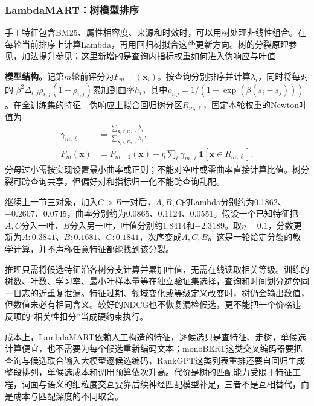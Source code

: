 \Needspace{100mm}
\subsubsection{LambdaMART：树模型排序}
\label{sec:rs-search-lambdamart}

手工特征包含BM25、属性相容度、来源和时效时，可以用树处理非线性组合。在每轮当前排序上计算Lambda，再用回归树拟合这些更新方向。树的分裂原理参见，加法提升参见；这里新增的是查询内指标权重如何进入伪响应与叶值

\textbf{模型结构。}记第$m$轮前评分为$F_{m-1}(\bm x_i)$。按查询分别排序并计算$\lambda_i$，同时将每对的
$\beta^2\Delta_{i,j}\rho_{i,j}(1-\rho_{i,j})$累加到曲率$h_i$，其中$\rho_{i,j}=1/(1+\exp(\beta(s_i-s_j)))$。在全训练集的特征—伪响应上拟合回归树分区$R_{m,\ell}$，固定本轮权重的Newton叶值为
\begin{equation}
 \begin{split}
 \gamma_{m,\ell}&=
 \frac{\sum_{\bm x_i\in R_{m,\ell}}\lambda_i}
      {\sum_{\bm x_i\in R_{m,\ell}}h_i},\\
 F_m(\bm x)&=F_{m-1}(\bm x)+
 \eta\sum_\ell\gamma_{m,\ell}\mathbf1[\bm x\in R_{m,\ell}].
 \end{split}
 \label{eq:rs-search-lambdamart}
\end{equation}
分母过小需按实现设置最小曲率或正则；不能对空叶或零曲率直接计算比值。树分裂可跨查询共享，但偏好对和指标归一化不能跨查询乱配。

继续上一节三对象，加入$C>B$一对后，$A,B,C$的Lambda分别约为0.1862、$-0.2607$、0.0745，曲率分别约为0.0865、0.1124、0.0551。假设一个已知特征把$A,C$分入一叶、$B$分入另一叶，叶值分别约1.8414和$-2.3189$。取$\eta=0.1$，分数更新为$A:0.3841$、$B:0.1681$、$C:0.1841$，次序变成$A,C,B$。这是一轮给定分裂的教学计算，并不声称任意特征都能找到该分裂。

推理只需将候选特征沿各树分支计算并累加叶值，无需在线读取相关等级。训练的树数、叶数、学习率、最小叶样本量等在独立验证集选择，查询和时间划分避免同一日志的近重复泄漏。特征过期、领域变化或等级定义改变时，树仍会输出数值，但数值未必有相同含义。较好的NDCG也不恢复漏检候选，更不能把一个价格违反项的“相关性扣分”当成硬约束执行。

成本上，LambdaMART依赖人工构造的特征，逐候选只是查特征、走树，单候选计算便宜，也不需要为每个候选重新编码文本；monoBERT这类交叉编码器要把查询与候选联合输入大模型逐候选编码，RankGPT这类列表重排还要自回归生成整段排列，单候选成本和调用预算依次升高。代价是树的匹配能力受限于特征工程，词面与语义的细粒度交互要靠后续神经匹配模型补足，三者不是互相替代，而是成本与匹配深度的不同取舍。

